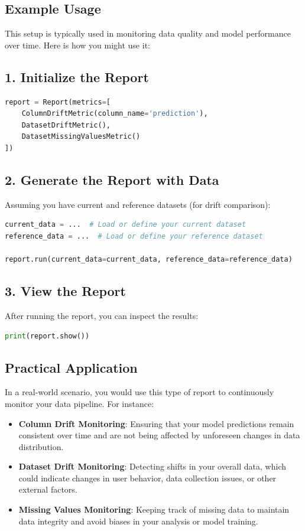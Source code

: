 \documentclass[letterpaper,12pt,notitlepage,twoside]{report}
\begin{document}
\subsection*{Example Usage}
This setup is typically used in monitoring data quality and model performance over time. Here is how you might use it:

\subsection*{1. Initialize the Report}
\begin{lstlisting}[language=Python]
report = Report(metrics=[
    ColumnDriftMetric(column_name='prediction'),
    DatasetDriftMetric(),
    DatasetMissingValuesMetric()
])
\end{lstlisting}

\subsection*{2. Generate the Report with Data}
Assuming you have current and reference datasets (for drift comparison):
\begin{lstlisting}[language=Python]
current_data = ...  # Load or define your current dataset
reference_data = ...  # Load or define your reference dataset

report.run(current_data=current_data, reference_data=reference_data)
\end{lstlisting}

\subsection*{3. View the Report}
After running the report, you can inspect the results:
\begin{lstlisting}[language=Python]
print(report.show())
\end{lstlisting}

\subsection*{Practical Application}
In a real-world scenario, you would use this type of report to continuously monitor your data pipeline. For instance:
\begin{itemize}
    \item \textbf{Column Drift Monitoring}: Ensuring that your model predictions remain consistent over time and are not being affected by unforeseen changes in data distribution.
    \item \textbf{Dataset Drift Monitoring}: Detecting shifts in your overall data, which could indicate changes in user behavior, data collection issues, or other external factors.
    \item \textbf{Missing Values Monitoring}: Keeping track of missing data to maintain data integrity and avoid biases in your analysis or model training.
\end{itemize}
\end{document}
